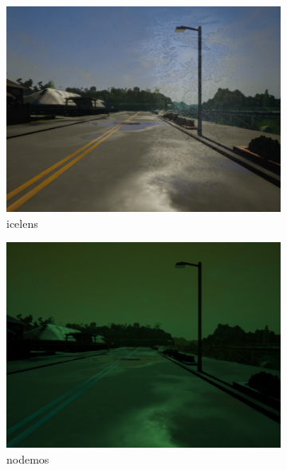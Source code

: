 \documentclass[14pt]{extarticle}
\begin{document}
\begin{figure}
\begin{subfigure}[b]{0.3\textwidth}
			 \includegraphics[scale=0.1]{./foto_sporcature/icelens.png}
	         \caption{icelens}
	         \label{fig:icelens}
	     \end{subfigure}
	     \hfill
	     \begin{subfigure}[b]{0.3\textwidth}
	         \centering
			 \includegraphics[scale=0.05]{./foto_sporcature/nodemos.png}
	         \caption{nodemos}
	         \label{fig:nodemos}
	     \end{subfigure}
	     \hfill
	     \begin{subfigure}[b]{0.3\textwidth}
	         \centering

\end{subfigure}
\end{figure}
\end{document}
